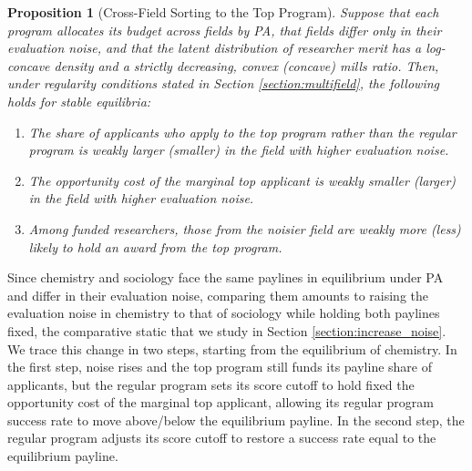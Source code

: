 \documentclass[12pt,reqno]{amsart}
\newtheorem{proposition}{Proposition}
\theoremstyle{definition}
\theoremstyle{plain} %
\begin{document}
\begin{proposition}[Cross-Field Sorting to the Top Program]\label{prop:intro}
Suppose that each program allocates its budget across fields by PA, that fields differ only in their evaluation noise, and that the latent distribution of researcher merit has a log-concave density and a strictly decreasing, convex (concave) mills ratio. Then, under regularity conditions stated in Section \ref{section:multifield}, the following holds for stable equilibria:
\vspace{-5pt}
\begin{enumerate}[label=(\arabic*),ref=\theproposition(\arabic*)]
  \item The share of applicants who apply to the top program rather than the regular program is weakly larger (smaller) in the field with higher evaluation noise.
  \item \label{prop:2}The opportunity cost of the marginal top applicant is weakly smaller (larger) in the field with higher evaluation noise.
  \item \label{prop:3} Among funded researchers, those from the noisier field are weakly more (less) likely to hold an award from the top program.
\end{enumerate}
\end{proposition}





\noindent Since chemistry and sociology face the same paylines in equilibrium under PA and differ in their evaluation noise, comparing them amounts to raising the evaluation noise in chemistry to that of sociology while holding both paylines fixed, the comparative static that we study in Section \ref{section:increase_noise}. We trace this change in two steps, starting from the equilibrium of chemistry. In the first step, noise rises and the top program still funds its payline share of applicants, but the regular program sets its score cutoff to hold fixed the opportunity cost of the marginal top applicant, allowing its regular program success rate to move above/below the equilibrium payline. In the second step, the regular program adjusts its score cutoff to restore a success rate equal to the equilibrium payline. 
\end{document}
